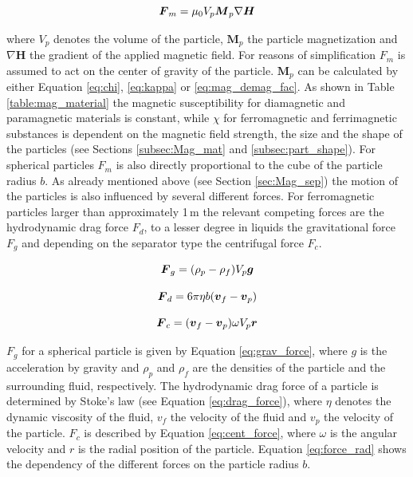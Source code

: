 \begin{equation}
\label{eq:mag_force}
\centering
\boldsymbol{F}_{m} = \mu_{0}V_{p}\boldsymbol{M}_{p}\nabla\boldsymbol{H}
\end{equation}

where $V_{p}$ denotes the volume of the particle, $\boldsymbol{M}_{p}$ the particle magnetization and $\nabla\boldsymbol{H}$ the gradient of the applied magnetic field. For reasons of simplification $F_{m}$ is assumed to act on the center of gravity of the particle. $\boldsymbol{M}_{p}$ can be calculated by either Equation \ref{eq:chi}, \ref{eq:kappa} or \ref{eq:mag_demag_fac}. As shown in Table \ref{table:mag_material} the magnetic susceptibility for diamagnetic and paramagnetic materials is constant, while $\chi$ for ferromagnetic and ferrimagnetic substances is dependent on the magnetic field strength, the size and the shape of the particles (see Sections \ref{subsec:Mag_mat} and \ref{subsec:part_shape}). For spherical particles $F_{m}$ is also directly proportional to the cube of the particle radius $b$. \newline
As already mentioned above (see Section \ref{sec:Mag_sep}) the motion of the particles is also influenced by several different  forces. For ferromagnetic particles larger than approximately 1\,\textmu m the relevant competing forces are  the hydrodynamic drag force $F_{d}$, to a lesser degree in liquids the gravitational force $F_{g}$ and depending on the separator type the centrifugal force $F_{c}$.  


\begin{equation}
\label{eq:grav_force}
\centering
\boldsymbol{F}_{g} = (\rho_{p}-\rho_{f})V_{p}\boldsymbol{g}
\end{equation}

\begin{equation}
\label{eq:drag_force}
\centering
\boldsymbol{F}_{d} = 6\pi\eta b(\boldsymbol{v}_{f}-\boldsymbol{v}_{p})
\end{equation}

\begin{equation}
\label{eq:cent_force}
\centering
\boldsymbol{F}_{c} = (\boldsymbol{v}_{f}-\boldsymbol{v}_{p})\omega V_{p}\boldsymbol{r}
\end{equation}

$F_{g}$ for a spherical particle is given by Equation \ref{eq:grav_force}, where $g$ is the acceleration by gravity and $\rho_{p}$ and $\rho_{f}$ are the densities of the particle and the surrounding fluid, respectively. The hydrodynamic drag force of a particle is determined by Stoke's law (see Equation \ref{eq:drag_force}), where $\eta$ denotes the dynamic viscosity of the fluid, $v_{f}$ the velocity of the fluid and $v_{p}$ the velocity of the particle. $F_{c}$ is described by Equation \ref{eq:cent_force}, where $\omega$ is the angular velocity and $r$ is the radial position of the particle. Equation \ref{eq:force_rad} shows the dependency of the different forces on the particle radius $b$. 

